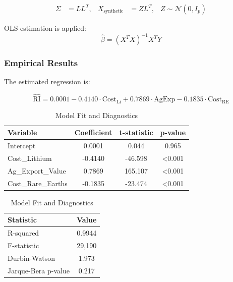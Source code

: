 \documentclass{apmcmthesis}
\begin{document}
\begin{align}
\Sigma &= LL^T, & X_{\text{synthetic}} &= ZL^T, & Z \sim \mathcal{N}(0, I_p)
\end{align}

OLS estimation is applied:
\[
\hat{\beta} = (X^TX)^{-1}X^TY
\]

\subsubsection{Empirical Results}
The estimated regression is:

\begin{equation}
\widehat{\mathrm{RI}} = 0.0001 - 0.4140 \cdot \mathrm{Cost}_{\mathrm{Li}} + 0.7869 \cdot \mathrm{AgExp} - 0.1835 \cdot \mathrm{Cost}_{\mathrm{RE}}
\end{equation}

\begin{table}[H]
\centering
\begin{minipage}{0.48\linewidth}
\centering
\caption{Regression Results}
\begin{tabular}{lccc}
\toprule
Variable & Coefficient & t-statistic & p-value \\
\midrule
Intercept & 0.0001 & 0.044 & 0.965 \\
Cost\_Lithium & -0.4140 & -46.598 & <0.001 \\
Ag\_Export\_Value & 0.7869 & 165.107 & <0.001 \\
Cost\_Rare\_Earths & -0.1835 & -23.474 & <0.001 \\
\bottomrule
\end{tabular}
\end{minipage}
\hfill
\begin{minipage}{0.48\linewidth}
\centering
\caption{Model Fit and Diagnostics}
\begin{tabular}{lc}
\toprule
Statistic & Value \\
\midrule
R-squared & 0.9944 \\
F-statistic & 29,190 \\
Durbin-Watson & 1.973 \\
Jarque-Bera p-value & 0.217 \\
\bottomrule
\end{tabular}
\end{minipage}
\end{table}
\end{document}
